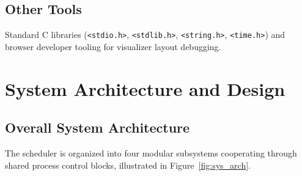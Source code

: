 \documentclass[12pt,a4paper]{report}
\begin{document}
\section{Other Tools}
Standard C libraries (\texttt{<stdio.h>}, \texttt{<stdlib.h>}, \texttt{<string.h>}, \texttt{<time.h>}) and browser developer tooling for visualizer layout debugging.

\chapter{System Architecture and Design}\label{ch5}

\section{Overall System Architecture}
The scheduler is organized into four modular subsystems cooperating through shared process control blocks, illustrated in Figure~\ref{fig:sys_arch}.
\end{document}
